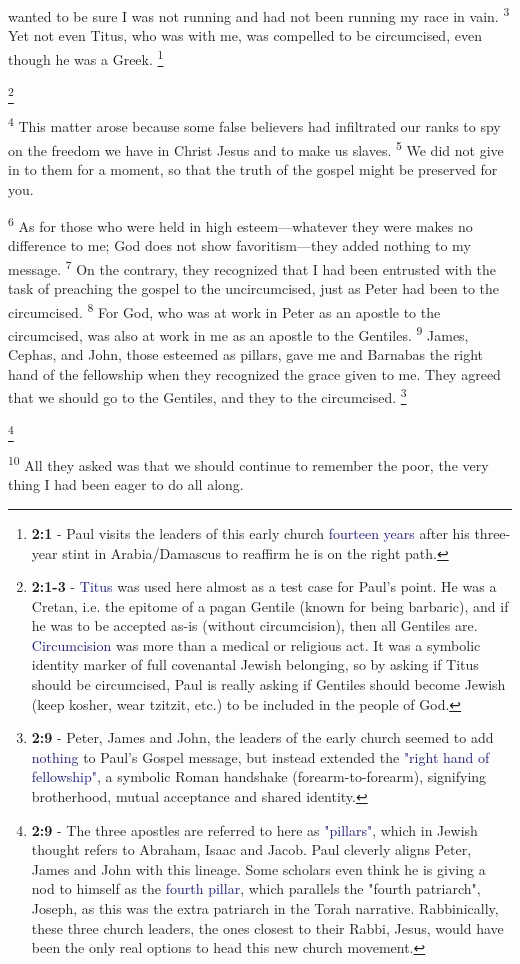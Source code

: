 \documentclass[12pt,twoside]{article}
\newcommand{\vs}[1]{\textsuperscript{#1}}
\newcommand{\vnote}[2]{%
  \begingroup
  \renewcommand\thefootnote{}%
  \footnote{\scriptsize \textbf{}#2}%
  \addtocounter{footnote}{-1}%
  \endgroup
}
\begin{document}
\noindent wanted to be sure I was not running and had not been running my race in vain.
\vs{3} Yet not even Titus, who was with me, was compelled to be circumcised, even though he was a Greek.\vnote{1}{\textbf{2:1} - Paul visits the leaders of this early church \textcolor{MidnightBlue}{fourteen years} after his three-year stint in Arabia/Damascus to reaffirm he is on the right path.}\vnote{1}{\textbf{2:1-3} - \textcolor{MidnightBlue}{Titus} was used here almost as a test case for Paul's point. He was a Cretan, i.e. the epitome of a pagan Gentile (known for being barbaric), and if he was to be accepted as-is (without circumcision), then all Gentiles are. \textcolor{MidnightBlue}{Circumcision} was more than a medical or religious act. It was a symbolic identity marker of full covenantal Jewish belonging, so by asking if Titus should be circumcised, Paul is really asking if Gentiles should become Jewish (keep kosher, wear tzitzit, etc.) to be included in the people of God.}
\vs{4} This matter arose because some false believers had infiltrated our ranks to spy on the freedom we have in Christ Jesus and to make us slaves.
\vs{5} We did not give in to them for a moment, so that the truth of the gospel might be preserved for you.

\vs{6} As for those who were held in high esteem---whatever they were makes no difference to me; God does not show favoritism---they added nothing to my message.
\vs{7} On the contrary, they recognized that I had been entrusted with the task of preaching the gospel to the uncircumcised, just as Peter had been to the circumcised.
\vs{8} For God, who was at work in Peter as an apostle to the circumcised, was also at work in me as an apostle to the Gentiles.
\vs{9} James, Cephas, and John, those esteemed as pillars, gave me and Barnabas the right hand of the fellowship when they recognized the grace given to me. They agreed that we should go to the Gentiles, and they to the circumcised.\vnote{9}{\textbf{2:9} - Peter, James and John, the leaders of the early church seemed to add \textcolor{MidnightBlue}{nothing} to Paul's Gospel message, but instead extended the \textcolor{MidnightBlue}{"right hand of fellowship"}, a symbolic Roman handshake (forearm-to-forearm), signifying brotherhood, mutual acceptance and shared identity.}\vnote{9}{\textbf{2:9} - The three apostles are referred to here as \textcolor{MidnightBlue}{"pillars"}, which in Jewish thought refers to Abraham, Isaac and Jacob. Paul cleverly aligns Peter, James and John with this lineage. Some scholars even think he is giving a nod to himself as the \textcolor{MidnightBlue}{fourth pillar}, which parallels the "fourth patriarch", Joseph, as this was the extra patriarch in the Torah narrative. Rabbinically, these three church leaders, the ones closest to their Rabbi, Jesus, would have been the only real options to head this new church movement.}
\vs{10} All they asked was that we should continue to remember the poor, the very thing I had been eager to do all along.
\end{document}
